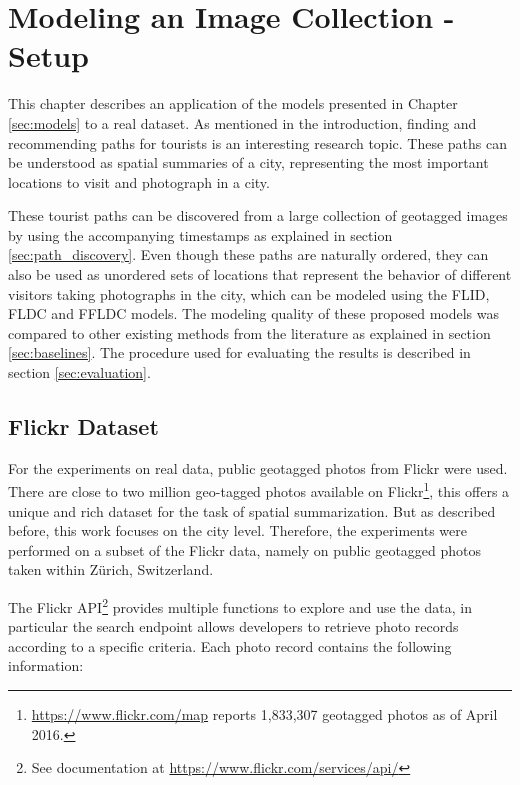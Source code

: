 \chapter{Modeling an Image Collection - Setup}
\label{sec:experimental_setup}

This chapter describes an application of the models presented in Chapter \ref{sec:models} to a real dataset. As mentioned in the introduction, finding and recommending paths for tourists is an interesting research topic. These paths can be understood as spatial summaries of a city, representing the most important locations to visit and photograph in a city.

These tourist paths can be discovered from a large collection of geotagged images by using the accompanying timestamps as explained in section \ref{sec:path_discovery}. Even though these paths are naturally ordered, they can also be used as unordered sets of locations that represent the behavior of different visitors taking photographs in the city, which can be modeled using the FLID, FLDC and FFLDC models. The modeling quality of these proposed models was compared to other existing methods from the literature as explained in section \ref{sec:baselines}. The procedure used for evaluating the results is described in section \ref{sec:evaluation}.

\section{Flickr Dataset}

For the experiments on real data, public geotagged photos from Flickr were used. There are close to two million geo-tagged photos available on Flickr\footnote{\url{https://www.flickr.com/map} reports 1,833,307 geotagged photos as of April 2016.}, this offers a unique and rich dataset for the task of spatial summarization. But as described before, this work focuses on the city level. Therefore, the experiments were performed on a subset of the Flickr data, namely on public geotagged photos taken within Zürich, Switzerland.

The Flickr API\footnote{See documentation at \url{https://www.flickr.com/services/api/}} provides multiple functions to explore and use the data, in particular the search endpoint allows developers to retrieve photo records according to a specific criteria. Each photo record contains the following information:

